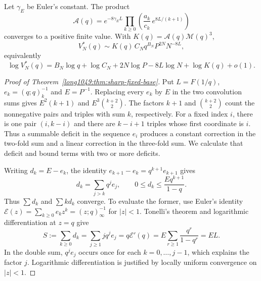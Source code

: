 \begin{theorem}
\label{long1049:thm:sharp-fixed-base}
Let $\gamma_{\!E}$ be Euler's constant. The product
\[
 \mathcal A(q)=e^{-8\gamma_{\!E}L}
 \prod_{k\ge0}\left(\frac{a_k}{c_k}\,e^{8L/(k+1)}\right)
\]
converges to a positive finite value. With $K(q)=\mathcal A(q)\mathcal M(q)^3$,
\[
 V_N^*(q)\sim K(q)\,C_Nq^{B_N}P^{2N}N^{-8L},
\]
equivalently
\[
 \log V_N^*(q)=B_N\log q+\log C_N+2N\log P-8L\log N+\log K(q)+o(1).
\]
\end{theorem}

\begin{proof}[Proof of Theorem~\ref{long1049:thm:sharp-fixed-base}]
Put $L=F(1/q)$, $e_k=(q;q)_k^{-1}$ and $E=P^{-1}$.
Replacing every $e_k$ by $E$ in the two convolution sums gives
$E^2(k+1)$ and $E^3\binom{k+2}{2}$. The factors $k+1$ and
$\binom{k+2}{2}$ count the nonnegative pairs and triples with sum $k$,
respectively.
For a fixed index $i$, there is one pair $(i,k-i)$ and there are
$k-i+1$ triples whose first coordinate is $i$. Thus a summable
deficit in the sequence $e_i$ produces a constant correction in the
two-fold sum and a linear correction in the three-fold sum.
We calculate that deficit and bound terms with two or more deficits.

Writing $d_k=E-e_k$, the identity
$e_{k+1}-e_k=q^{k+1}e_{k+1}$ gives
\[
 d_k=\sum_{j>k}q^je_j,\qquad
 0\le d_k\le\frac{E q^{k+1}}{1-q}.
\]
Thus $\sum d_k$ and $\sum k d_k$ converge. To evaluate the former,
use Euler's identity
$\mathcal E(z)=\sum_{k\ge0}e_kz^k=(z;q)_\infty^{-1}$ for $|z|<1$.
Tonelli's theorem and logarithmic differentiation at $z=q$ give
\[
 S:=\sum_{k\ge0}d_k
 =\sum_{j\ge1}j q^je_j
 =q\mathcal E'(q)
 =E\sum_{r\ge1}\frac{q^r}{1-q^r}=EL.
\]
In the double sum, $q^je_j$ occurs once for each $k=0,\ldots,j-1$,
which explains the factor $j$. Logarithmic differentiation is
justified by locally uniform convergence on $|z|<1$.


\end{proof}
